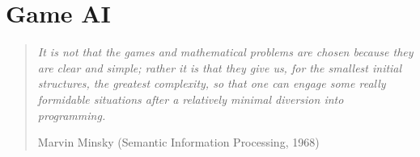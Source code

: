 \chapter{Game AI}

\begin{quotation}\textit{It is not that the games and mathematical problems are chosen because they are clear and simple; rather it is that they give us, for the smallest initial structures, the greatest complexity, so that one can engage some really formidable situations after a relatively minimal diversion into programming.} 
\begin{flushright}Marvin Minsky (Semantic Information Processing, 1968)\end{flushright}\end{quotation}





